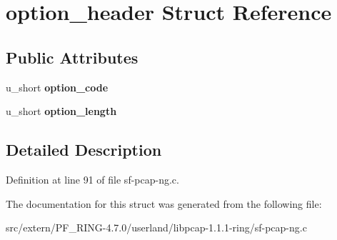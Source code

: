 \hypertarget{structoption__header}{
\section{option\_\-header Struct Reference}
\label{structoption__header}
}
\subsection*{Public Attributes}
\begin{DoxyCompactItemize}
\item 
\hypertarget{structoption__header_a9b5a5c07f2e54e4532ea1682372dff2b}{
u\_\-short {\bfseries option\_\-code}}
\label{structoption__header_a9b5a5c07f2e54e4532ea1682372dff2b}

\item 
\hypertarget{structoption__header_a8a8b944929f0796e5ea13c915687d65a}{
u\_\-short {\bfseries option\_\-length}}
\label{structoption__header_a8a8b944929f0796e5ea13c915687d65a}

\end{DoxyCompactItemize}


\subsection{Detailed Description}


Definition at line 91 of file sf-\/pcap-\/ng.c.



The documentation for this struct was generated from the following file:\begin{DoxyCompactItemize}
\item 
src/extern/PF\_\-RING-\/4.7.0/userland/libpcap-\/1.1.1-\/ring/sf-\/pcap-\/ng.c\end{DoxyCompactItemize}
